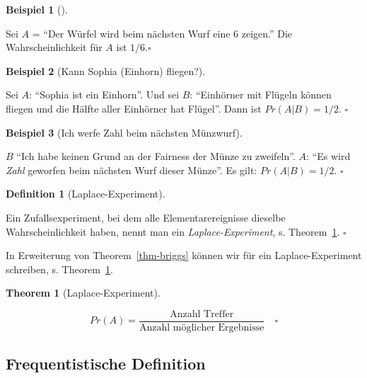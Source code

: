 \documentclass[
  ngerman,
  letterpaper,
  twoside,
  open=any]{scrbook}
\theoremstyle{definition}
\newtheorem{example}{Beispiel}[chapter]
\theoremstyle{plain}
\newtheorem{theorem}{Theorem}[chapter]
\theoremstyle{definition}
\theoremstyle{definition}
\newtheorem{definition}{Definition}[chapter]
\theoremstyle{remark}
\begin{document}
\begin{example}[]\protect\hypertarget{exm-briggs}{}\label{exm-briggs}

Sei \(A\) = \enquote{Der Würfel wird beim nächsten Wurf eine 6 zeigen.}
Die Wahrscheinlichkeit für \(A\) ist \(1/6. \square\)

\end{example}

\begin{example}[Kann Sophia (Einhorn)
fliegen?]\protect\hypertarget{exm-prob}{}\label{exm-prob}

Sei \(A\): \enquote{Sophia ist ein Einhorn}. Und sei \(B\):
\enquote{Einhörner mit Flügeln können fliegen und die Hälfte aller
Einhörner hat Flügel}. Dann ist \(Pr(A|B) = 1/2\). \(\square\)

\end{example}

\begin{example}[Ich werfe Zahl beim nächsten
Münzwurf]\protect\hypertarget{exm-prob3}{}\label{exm-prob3}

\(B\) \enquote{Ich habe keinen Grund an der Fairness der Münze zu
zweifeln}. \(A\): \enquote{Es wird \emph{Zahl} geworfen beim nächsten
Wurf dieser Münze}. Es gilt: \(Pr(A|B) = 1/2\). \(\square\)

\end{example}

\begin{definition}[Laplace-Experiment]\protect\hypertarget{def-laplace}{}\label{def-laplace}

Ein Zufallsexperiment, bei dem alle Elementarereignisse dieselbe
Wahrscheinlichkeit haben, nennt man ein \emph{Laplace-Experiment}, s.
Theorem~\ref{thm-laplace}. \(\square\)

\end{definition}

In Erweiterung von Theorem~\ref{thm-briggs} können wir für ein
Laplace-Experiment schreiben, s. Theorem~\ref{thm-laplace}.

\begin{theorem}[Laplace-Experiment]\protect\hypertarget{thm-laplace}{}\label{thm-laplace}

\[Pr(A)=\frac{\text{Anzahl Treffer}}{\text{Anzahl möglicher Ergebnisse}} \quad \square\]

\end{theorem}

\subsection{Frequentistische
Definition}\label{frequentistische-definition}
\end{document}

